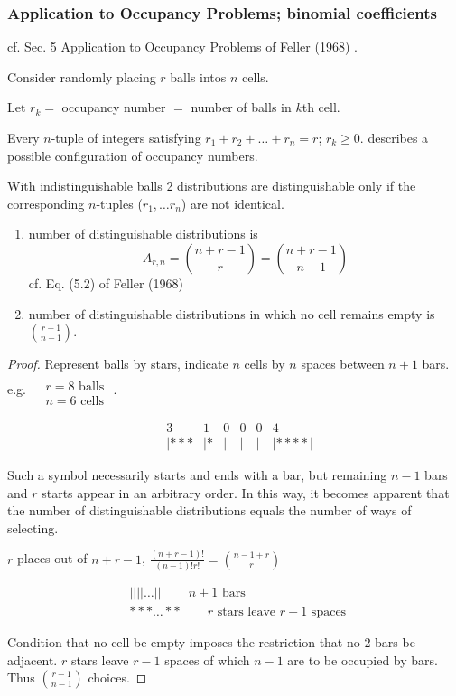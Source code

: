 \subsubsection{Application to Occupancy Problems; binomial coefficients}

cf. Sec. 5 Application to Occupancy Problems of Feller (1968)  \cite{dgdt:Fell1968}.  

Consider randomly placing $r$ balls intos $n$ cells.  

Let $r_k = $ occupancy number $=$ number of balls in $k$th cell.  

Every $n$-tuple of integers satisfying $r_1 + r_2 + \dots + r_n = r$;  $r_k \geq 0$.  describes a possible configuration of occupancy numbers.  

With indistinguishable balls 2 distributions are distinguishable only if the corresponding $n$-tuples ($r_1,\dots r_n$) are not identical.  

\begin{enumerate}
\item[(i)] number of distinguishable distributions is 
\begin{equation}
A_{r,n} = \binom{n+r-1}{r} = \binom{n+r-1}{n-1}  
\end{equation} cf. Eq. (5.2) of Feller (1968)  \cite{dgdt:Fell1968}
\item[(ii)]  number of distinguishable distributions in which no cell remains empty is $\binom{r-1}{n-1}$.  
\end{enumerate}

\begin{proof}
Represent balls by stars, indicate $n$ cells by $n$ spaces between $n+1$ bars.  e.g. $\begin{aligned} & \quad \\ 
& r= 8 \text{ balls } \\
& n = 6 \text{ cells } \end{aligned}$.  

\[
\begin{aligned}
	& 3 	  & 1   & 0 & 0 & 0 & 4 \\
	& | * * * & | * & | & |   & | & | **** |  
\end{aligned}
\]

Such a symbol necessarily starts and ends with a bar, but remaining $n-1$ bars and $r$ starts appear in an arbitrary order.  In this way, it becomes apparent that the number of distinguishable distributions equals the number of ways of selecting.  

$r$ places out of $n+r-1$, $\frac{ (n+r-1)! }{ (n-1)! r!} = \binom{n-1+r}{r} $  

\[
\begin{aligned}
	& | | | | \dots | | \qquad \, n+1 \text{ bars } \\ 
	& * * * \dots * * \qquad \, r \text{ stars leave } r-1 \text{ spaces }
\end{aligned}
\]

Condition that no cell be empty imposes the restriction that no 2 bars be adjacent.  $r$ stars leave $r-1$ spaces of which $n-1$ are to be occupied by bars.  Thus $\binom{r-1}{n-1}$ choices.  


\end{proof}


